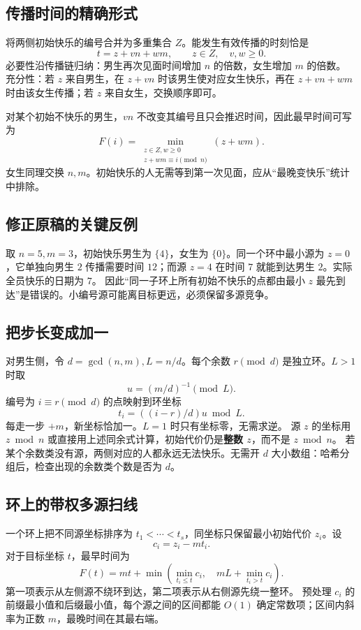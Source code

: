 \documentclass[UTF8,a4paper,11pt,oneside,openany,fontset=fandol]{ctexbook}
\theoremstyle{definition}
\begin{document}
\subsection{传播时间的精确形式}
将两侧初始快乐的编号合并为多重集合 $Z$。能发生有效传播的时刻恰是
\[
 t=z+vn+wm,\qquad z\in Z,\quad v,w\ge0.
\]
必要性沿传播链归纳：男生再次见面时间增加 $n$ 的倍数，女生增加 $m$ 的倍数。
充分性：若 $z$ 来自男生，在 $z+vn$ 时该男生使对应女生快乐，再在 $z+vn+wm$ 时由该女生传播；若 $z$ 来自女生，交换顺序即可。

对某个初始不快乐的男生，$vn$ 不改变其编号且只会推迟时间，因此最早时间可写为
\[
 F(i)=\min_{\substack{z\in Z,w\ge0\\z+wm\equiv i\pmod n}}(z+wm).
\]
女生同理交换 $n,m$。初始快乐的人无需等到第一次见面，应从“最晚变快乐”统计中排除。

\subsection{修正原稿的关键反例}
取 $n=5,m=3$，初始快乐男生为 $\{4\}$，女生为 $\{0\}$。同一个环中最小源为 $z=0$，它单独向男生 $2$ 传播需要时间 $12$；而源 $z=4$ 在时间 $7$ 就能到达男生 $2$。实际全员快乐的日期为 $7$。
因此“同一子环上所有初始不快乐的点都由最小 $z$ 最先到达”是错误的。小编号源可能离目标更远，必须保留多源竞争。

\subsection{把步长变成加一}
对男生侧，令 $d=\gcd(n,m),L=n/d$。每个余数 $r\pmod d$ 是独立环。$L>1$ 时取
\[
 u=(m/d)^{-1}\pmod L.
\]
编号为 $i\equiv r\pmod d$ 的点映射到环坐标
\[
 t_i=((i-r)/d)u\bmod L.
\]
每走一步 $+m$，新坐标恰加一。$L=1$ 时只有坐标零，无需求逆。
源 $z$ 的坐标用 $z\bmod n$ 或直接用上述同余式计算，初始代价仍是\textbf{整数 $z$}，而不是 $z\bmod n$。
若某个余数类没有源，两侧对应的人都永远无法快乐。无需开 $d$ 大小数组：哈希分组后，检查出现的余数类个数是否为 $d$。

\subsection{环上的带权多源扫线}
一个环上把不同源坐标排序为 $t_1<\cdots<t_s$，同坐标只保留最小初始代价 $z_i$。设
\[
 c_i=z_i-mt_i.
\]
对于目标坐标 $t$，最早时间为
\[
 F(t)=mt+\min\left(
 \min_{t_i\le t}c_i,\quad
 mL+\min_{t_i>t}c_i\right).
\]
第一项表示从左侧源不绕环到达，第二项表示从右侧源先绕一整环。
预处理 $c_i$ 的前缀最小值和后缀最小值，每个源之间的区间都能 $O(1)$ 确定常数项；区间内斜率为正数 $m$，最晚时间在其最右端。
\end{document}
